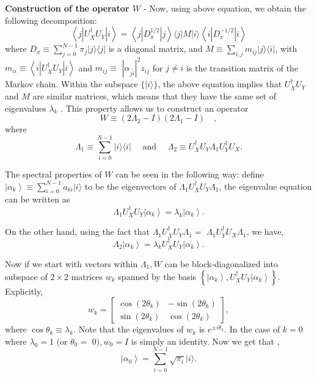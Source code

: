 \begin{flushleft}
	\textbf{Construction of the operator $W$ }- Now, using above equation, we obtain the following decomposition:
	$$
	\left\langle j\left|U_X^{\dagger} U_Y\right| i\right\rangle=\left\langle j\left|D_\pi^{1 / 2}\right| j\right\rangle\langle j|M| i\rangle\left\langle i\left|D_\pi^{-1 / 2}\right| i\right\rangle
	$$
	where $D_\pi \equiv \sum_{j=0}^{N-1} \pi_j|j\rangle\langle j|$ is a diagonal matrix, and $M \equiv \sum_{i, j} m_{i j}|j\rangle\langle i|$, with $m_{i i} \equiv\left\langle i\left|U_X^{\dagger} U_Y\right| i\right\rangle$ and $m_{i j} \equiv$ $\left|\alpha_{j \tilde{i}}\right|^2 z_{i j}$ for $j \neq i$ is the transition matrix of the Markov chain. Within the subspace $\{|i\rangle\}$, the above equation implies that $U_X^{\dagger} U_Y$ and $M$ are similar matrices, which means that
	they have the same set of eigenvalues $\lambda_k$ .  This property allows us to construct an operator
	$$
	W \equiv\left(2 \Lambda_2-I\right)\left(2 \Lambda_1-I\right) \quad,
	$$
	where
	$$
	\Lambda_1 \equiv \sum_{i=0}^{N-1}|i\rangle\langle i| \quad \text { and } \quad \Lambda_2 \equiv U_X^{\dagger} U_Y \Lambda_1 U_Y^{\dagger} U_X .
	$$
	
	The spectral properties of $W$ can be seen in the following way: define $\left|\alpha_k\right\rangle \equiv \sum_{i=0}^{N-1} a_{k i}|i\rangle$ to be the eigenvectors of $\Lambda_1 U_X^{\dagger} U_Y \Lambda_1$, the eigenvalue equation can be written as
	$$
	\Lambda_1 U_X^{\dagger} U_Y\left|\alpha_k\right\rangle=\lambda_k\left|\alpha_k\right\rangle .
	$$
	
	On the other hand, using the fact that $\Lambda_1 U_X^{\dagger} U_Y \Lambda_1=$ $\Lambda_1 U_Y^{\dagger} U_X \Lambda_1$, we have,
	$$
	\Lambda_2\left|\alpha_k\right\rangle=\lambda_k U_X^{\dagger} U_Y\left|\alpha_k\right\rangle .
	$$
	
	Now if we start with vectors within $\Lambda_1, W$ can be block-diagonalized into subspace of $2 \times 2$ matrices $w_k$ spanned by the basis $\left\{\left|\alpha_k\right\rangle, U_X^{\dagger} U_Y\left|\alpha_k\right\rangle\right\}$. Explicitly,
	$$
	w_k=\left[\begin{array}{cc}
		\cos \left(2 \theta_k\right) & -\sin \left(2 \theta_k\right) \\
		\sin \left(2 \theta_k\right) & \cos \left(2 \theta_k\right)
	\end{array}\right],
	$$
	where $\cos \theta_k \equiv \lambda_k$. Note that the eigenvalues of $w_k$ is $e^{ \pm i \theta_k}$. In the case of $k=0$ where $\lambda_0=1$ (or $\theta_0=$ $0), w_0=I$ is simply an identity. Now we get that ,
	$$
	\left|\alpha_0\right\rangle=\sum_{i=0}^{N-1} \sqrt{\pi_i}|i\rangle .
	$$
	

\end{flushleft}
